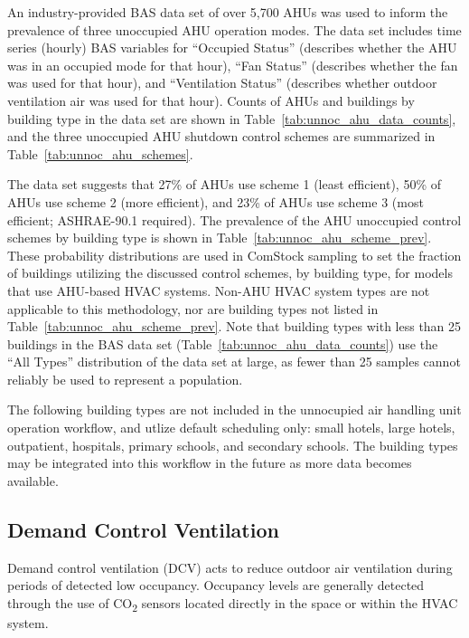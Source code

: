 An industry-provided BAS data set of over 5,700 AHUs was used to inform the prevalence of three unoccupied AHU operation modes. The data set includes time series (hourly) BAS variables for ``Occupied Status'' (describes whether the AHU was in an occupied mode for that hour), ``Fan Status'' (describes whether the fan was used for that hour), and ``Ventilation Status'' (describes whether outdoor ventilation air was used for that hour). Counts of AHUs and buildings by building type in the data set are shown in Table~\ref{tab:unnoc_ahu_data_counts}, and the three unoccupied AHU shutdown control schemes are summarized in Table~\ref{tab:unnoc_ahu_schemes}.

The data set suggests that 27\% of AHUs use scheme 1 (least efficient), 50\% of AHUs use scheme 2 (more efficient), and 23\% of AHUs use scheme 3 (most efficient; ASHRAE-90.1 required). The prevalence of the AHU unoccupied control schemes by building type is shown in Table~\ref{tab:unnoc_ahu_scheme_prev}. These probability distributions are used in ComStock sampling to set the fraction of buildings utilizing the discussed control schemes, by building type, for models that use AHU-based HVAC systems. Non-AHU HVAC system types are not applicable to this methodology, nor are building types not listed in Table~\ref{tab:unnoc_ahu_scheme_prev}. Note that building types with less than 25 buildings in the BAS data set (Table~\ref{tab:unnoc_ahu_data_counts}) use the ``All Types'' distribution of the data set at large, as fewer than 25 samples cannot reliably be used to represent a population.

The following building types are not included in the unnocupied air handling unit operation workflow, and utlize default scheduling only: small hotels, large hotels, outpatient, hospitals, primary schools, and secondary schools. The building types may be integrated into this workflow in the future as more data becomes available.




\subsection{Demand Control Ventilation}

Demand control ventilation (DCV) acts to reduce outdoor air ventilation during periods of detected low occupancy. Occupancy levels are generally detected through the use of CO\textsubscript{2} sensors located directly in the space or within the HVAC system.

